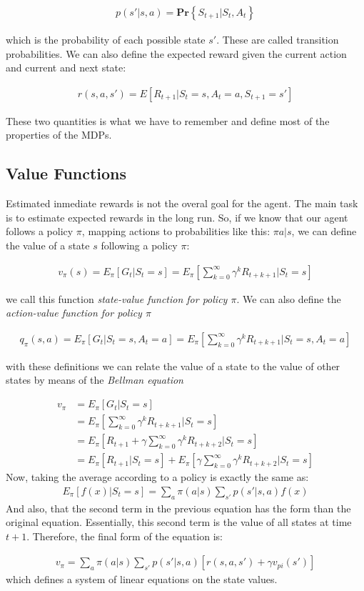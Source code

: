 \documentclass{article}
\begin{document}
\begin{align}
p(s' | s, a) = \mathbf{Pr}\left\{S_{t+1} | S_t, A_t \right\} 
\end{align}

which is the probability of each possible state $s'$. These are called transition probabilities. We can also define the expected reward given the current action and current and next state:

\begin{align}
r(s, a, s') = E \left[ R_{t+1} | S_t = s, A_t = a, S_{t+1} = s' \right]
\end{align}

These two quantities is what we have to remember and define most of the properties of the MDPs.

\subsection{Value Functions}

Estimated inmediate rewards is not the overal goal for the agent. The main task is to estimate expected rewards in the long run. So, if we know that our agent follows a policy $\pi$, mapping actions to probabilities like this: $\pi{a|s}$, we can define the value of a state $s$ following a policy $\pi$:

\begin{align}
v_{\pi}(s) = E_{\pi}\left[ G_t | S_t = s \right] = E_{\pi}\left[\sum_{k=0}^{\infty} \gamma^k R_{t+k+1} | S_t = s \right]
\end{align}

we call this function \emph{state-value function for policy $\pi$}. We can also define the \emph{action-value function for policy $\pi$}

\begin{align}
q_{\pi}(s, a) = E_{\pi}\left[ G_t | S_t = s , A_t = a \right] = E_{\pi}\left[\sum_{k=0}^{\infty} \gamma^k R_{t+k+1} | S_t = s, A_t = a \right]
\end{align}

with these definitions we can relate the value of a state to the value of other states by means of the \emph{Bellman equation}

\begin{align}
v_{\pi} &= E_{\pi}\left[G_t | S_t = s \right] \\
&= E_{\pi}\left[\sum_{k=0}^{\infty} \gamma^k R_{t+k+1} | S_t = s \right] \\
&= E_{\pi}\left[R_{t+1} + \gamma \sum_{k=0}^{\infty} \gamma^k R_{t+k+2} | S_t = s \right] \\
&= E_{\pi}\left[R_{t+1}|S_t=s\right] + E_{\pi}\left[\gamma \sum_{k=0}^{\infty} \gamma^k R_{t+k+2} | S_t = s \right]
\end{align}
Now, taking the average according to a policy is exactly the same as:
\begin{align}
E_{\pi}\left[f(x) | S_t = s \right] = \sum_{a}\pi(a|s) \sum_{s'} p(s' | s,a) f(x)
\end{align}
And also, that the second term in the previous equation has the form than the original equation. Essentially, this second term is the value of all states at time $t+1$. Therefore, the final form of the equation is:

\begin{align}
v_{\pi} =  \sum_{a}\pi(a|s) \sum_{s'} p(s' | s,a) \left[ r(s,a,s') + \gamma v_{pi}(s') \right]
\end{align}
which defines a system of linear equations on the state values.
\end{document}
